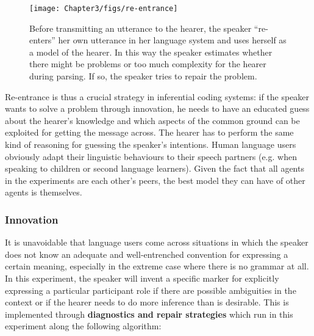\begin{figure}[b]
\centerline{\texttt{[image: Chapter3/figs/re-entrance]}}
  \caption[Speaker re-entrance]{Before transmitting an utterance to the hearer, the speaker ``re-enters'' her own utterance in her language system and uses herself as a model of the hearer. In this way the speaker estimates whether there might be problems or too much complexity for the hearer during parsing. If so, the speaker tries to repair the problem.}
   \label{f:re-entrance}
\end{figure}


Re-entrance is thus a crucial strategy in inferential coding systems: if the speaker wants to solve a problem through innovation, he needs to have an educated guess about the hearer's knowledge and which aspects of the common ground can be exploited for getting the message across. The hearer has to perform the same kind of reasoning for guessing the speaker's intentions. Human language users obviously adapt their linguistic behaviours to their speech partners (e.g. when speaking to children or second language learners). Given the fact that all agents in the experiments are each other's peers, the best model they can have of other agents is themselves.


\subsubsection{Innovation}
 It is unavoidable that language users come across situations in which the speaker does not know an adequate and well-entrenched convention for expressing a certain meaning, especially in the extreme case where there is no grammar at all. In this experiment, the speaker will invent a specific marker for explicitly expressing a particular participant role if there are possible ambiguities in the context or if the hearer needs to do more inference than is desirable. This is implemented through {\bfseries diagnostics and repair strategies} which run in this experiment along the following algorithm:

